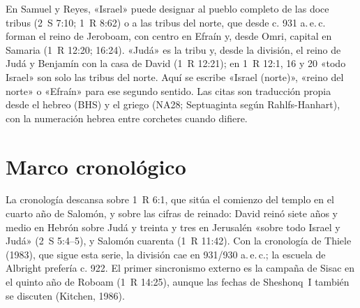 \documentclass[11pt,letterpaper]{article}
\begin{document}
\begin{nota}
En Samuel y Reyes, «Israel» puede designar al pueblo completo de las doce tribus (2~S 7:10; 1~R 8:62) o a las tribus del norte, que desde c. 931 a.\,e.\,c. forman el reino de Jeroboam, con centro en Efraín y, desde Omri, capital en Samaria (1~R 12:20; 16:24). «Judá» es la tribu y, desde la división, el reino de Judá y Benjamín con la casa de David (1~R 12:21); en 1~R 12:1, 16 y 20 «todo Israel» son solo las tribus del norte. Aquí se escribe «Israel (norte)», «reino del norte» o «Efraín» para ese segundo sentido. Las citas son traducción propia desde el hebreo (BHS) y el griego (NA28; Septuaginta según Rahlfs-Hanhart), con la numeración hebrea entre corchetes cuando difiere.
\end{nota}

\section{Marco cronológico}

La cronología descansa sobre 1~R 6:1, que sitúa el comienzo del templo en el cuarto año de Salomón, y sobre las cifras de reinado: David reinó siete años y medio en Hebrón sobre Judá y treinta y tres en Jerusalén «sobre todo Israel y Judá» (2~S 5:4--5), y Salomón cuarenta (1~R 11:42). Con la cronología de Thiele (1983), que sigue esta serie, la división cae en 931/930 a.\,e.\,c.; la escuela de Albright prefería c. 922. El primer sincronismo externo es la campaña de Sisac en el quinto año de Roboam (1~R 14:25), aunque las fechas de Sheshonq~I también se discuten (Kitchen, 1986).
\end{document}
